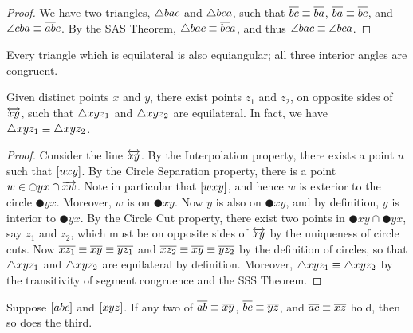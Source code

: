 \begin{proof}
We have two triangles, \(\bigtriangleup{bac}\) and \(\bigtriangleup{bca}\), such that \(\overline{bc}\equiv \overline{ba}\), \(\overline{ba} \equiv \overline{bc}\), and \(\angle{cba} \equiv \overline{ab}{c}\). By the SAS Theorem, \(\bigtriangleup{bac} \equiv \overline{bc}{a}\), and thus \(\angle{bac} \equiv \angle{bca}\).
\end{proof}

\begin{cor}
Every triangle which is equilateral is also equiangular; all three interior angles are congruent.
\end{cor}

\begin{construct}
Given distinct points \(x\) and \(y\), there exist points \(z_1\) and \(z_2\), on opposite sides of \(\overleftrightarrow{xy}\), such that \(\bigtriangleup{xyz_1}\) and \(\bigtriangleup{xyz_2}\) are equilateral. In fact, we have \(\bigtriangleup{xyz_1} \equiv \bigtriangleup{xyz_2}\).
\end{construct}

\begin{proof}
Consider the line \(\overleftrightarrow{xy}\). By the Interpolation property, there exists a point \(u\) such that \([ u x y ]\). By the Circle Separation property, there is a point \(w \in \ocircle{yx} \cap \overrightarrow{xw}\). Note in particular that \([ w x y ]\), and hence \(w\) is exterior to the circle \(\CIRCLE{y}{x}\). Moreover, \(w\) is on \(\CIRCLE{x}{y}\). Now \(y\) is also on \(\CIRCLE{x}{y}\), and by definition, \(y\) is interior to \(\CIRCLE{y}{x}\). By the Circle Cut property, there exist two points in \(\CIRCLE{x}{y} \cap \CIRCLE{y}{x}\), say \(z_1\) and \(z_2\), which must be on opposite sides of \(\overleftrightarrow{xy}\) by the uniqueness of circle cuts. Now \(\overline{xz_1} \equiv \overline{xy} \equiv \overline{yz_1}\) and \(\overline{xz_2} \equiv \overline{xy} \equiv \overline{yz_2}\) by the definition of circles, so that \(\bigtriangleup{xyz_1}\) and \(\bigtriangleup{xyz_2}\) are equilateral by definition. Moreover, \(\bigtriangleup{xyz_1} \equiv \bigtriangleup{xyz_2}\) by the transitivity of segment congruence and the SSS Theorem.
\end{proof}

\begin{prop}
Suppose \([ a b c ]\) and \([ x y z ]\). If any two of \(\overline{ab} \equiv \overline{xy}\), \(\overline{bc} \equiv \overline{yz}\), and \(\overline{ac} \equiv \overline{xz}\) hold, then so does the third.
\end{prop}

